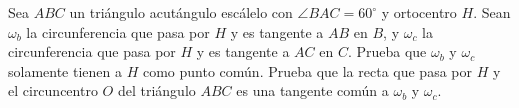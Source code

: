 Sea $ABC$ un triángulo acutángulo escálelo con $\angle BAC=60^{\circ}$ y ortocentro $H$. Sean $\omega_b$ la circunferencia que pasa por $H$ y es tangente a $AB$ en $B$, y $\omega_c$ la circunferencia que pasa por $H$ y es tangente a $AC$ en $C$. Prueba que $\omega_b$ y $\omega_c$ solamente tienen a $H$ como punto común.  Prueba que la recta que pasa por $H$ y el circuncentro $O$ del triángulo $ABC$ es una tangente común a $\omega_b$ y $\omega_c$.
